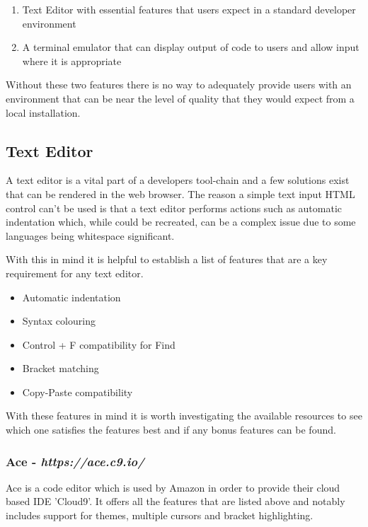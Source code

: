 \begin{enumerate}
  \item Text Editor with essential features that users expect in a standard developer environment
  \item A terminal emulator that can display output of code to users and allow input where it is appropriate
\end{enumerate}

Without these two features there is no way to adequately provide users with an environment that can be near the level of quality that they would expect from a local installation.

\subsection{Text Editor}

A text editor is a vital part of a developers tool-chain and a few solutions exist that can be rendered in the web browser. The reason a simple text input HTML control can't be used is that a text editor performs actions such as automatic indentation which, while could be recreated, can be a complex issue due to some languages being whitespace significant.

With this in mind it is helpful to establish a list of features that are a key requirement for any text editor.

\begin{itemize}
  \item Automatic indentation
  \item Syntax colouring
  \item Control + F compatibility for Find
  \item Bracket matching
  \item Copy-Paste compatibility
\end{itemize}

With these features in mind it is worth investigating the available resources to see which one satisfies the features best and if any bonus features can be found.

\subsubsection{Ace - \textit{https://ace.c9.io/}}

Ace is a code editor which is used by Amazon in order to provide their cloud based IDE 'Cloud9'. It offers all the features that are listed above and notably includes support for themes, multiple cursors and bracket highlighting.

